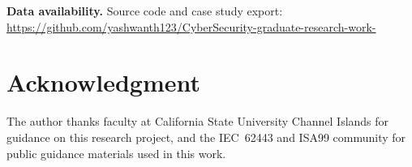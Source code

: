\documentclass[10pt,conference]{IEEEtran}
\begin{document}
\textbf{Data availability.} Source code and case study export: \url{https://github.com/yashwanth123/CyberSecurity-graduate-research-work-}

\section*{Acknowledgment}
The author thanks faculty at California State University Channel Islands for guidance on this research project, and the IEC~62443 and ISA99 community for public guidance materials used in this work.



\end{document}
